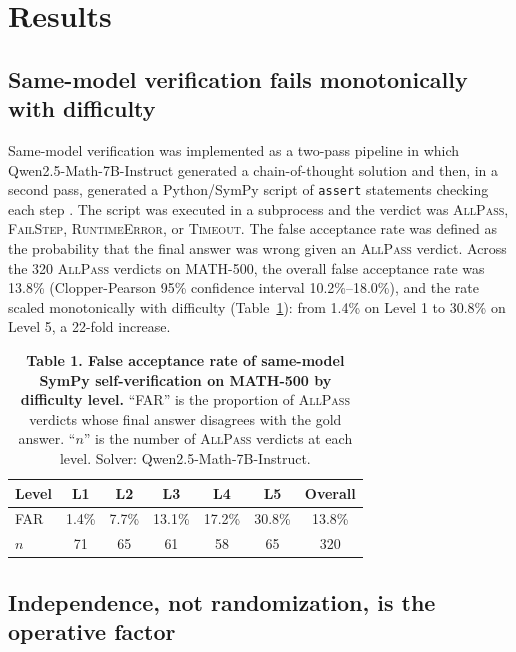 \documentclass[11pt]{article}
\begin{document}
\section{Results}
\label{sec:results}

\subsection{Same-model verification fails monotonically with difficulty}

Same-model verification was implemented as a two-pass pipeline in which Qwen2.5-Math-7B-Instruct generated a chain-of-thought solution and then, in a second pass, generated a Python/SymPy script of \texttt{assert} statements checking each step \citep{yang2024qwen25math}. The script was executed in a subprocess and the verdict was \textsc{AllPass}, \textsc{FailStep}, \textsc{RuntimeError}, or \textsc{Timeout}. The false acceptance rate was defined as the probability that the final answer was wrong given an \textsc{AllPass} verdict. Across the 320 \textsc{AllPass} verdicts on MATH-500, the overall false acceptance rate was 13.8\% (Clopper-Pearson 95\% confidence interval 10.2\%--18.0\%), and the rate scaled monotonically with difficulty (Table~\ref{tab:collapse}): from 1.4\% on Level 1 to 30.8\% on Level 5, a 22-fold increase.

\begin{table}[h]
\centering
\caption{\textbf{Table 1. False acceptance rate of same-model SymPy self-verification on MATH-500 by difficulty level.} ``FAR'' is the proportion of \textsc{AllPass} verdicts whose final answer disagrees with the gold answer. ``$n$'' is the number of \textsc{AllPass} verdicts at each level. Solver: Qwen2.5-Math-7B-Instruct.}
\label{tab:collapse}
\small
\begin{tabular}{lcccccc}
\toprule
Level & L1 & L2 & L3 & L4 & L5 & Overall \\
\midrule
FAR & 1.4\% & 7.7\% & 13.1\% & 17.2\% & 30.8\% & 13.8\% \\
$n$ & 71 & 65 & 61 & 58 & 65 & 320 \\
\bottomrule
\end{tabular}
\end{table}

\subsection{Independence, not randomization, is the operative factor}
\end{document}
